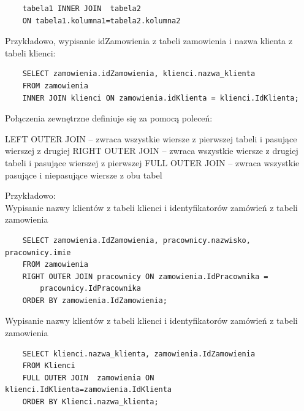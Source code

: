 \documentclass[12pt]{article}
\begin{document}
    \begin{verbatim}
    tabela1 INNER JOIN  tabela2
    ON tabela1.kolumna1=tabela2.kolumna2
    \end{verbatim}
    Przykładowo, wypisanie idZamowienia z tabeli zamowienia i nazwa klienta z tabeli klienci:
    
    \begin{verbatim}
    SELECT zamowienia.idZamowienia, klienci.nazwa_klienta
    FROM zamowienia
    INNER JOIN klienci ON zamowienia.idKlienta = klienci.IdKlienta;
    \end{verbatim}
    
    Połączenia zewnętrzne definiuje się za pomocą poleceń:
    
    LEFT OUTER JOIN – zwraca wszystkie wiersze z pierwszej tabeli i pasujące wierszej z drugiej
    RIGHT OUTER JOIN – zwraca wszystkie wiersze z drugiej tabeli i pasujące wierszej z pierwszej
    FULL OUTER JOIN – zwraca wszystkie pasujące i niepasujące wiersze z obu tabel
    
    Przykładowo:\\
    Wypisanie nazwy klientów z tabeli klienci i identyfikatorów zamówień z tabeli zamowienia
    \begin{verbatim}
    SELECT zamowienia.IdZamowienia, pracownicy.nazwisko, pracownicy.imie
    FROM zamowienia
    RIGHT OUTER JOIN pracownicy ON zamowienia.IdPracownika =
        pracownicy.IdPracownika
    ORDER BY zamowienia.IdZamowienia;
    \end{verbatim}
    Wypisanie nazwy klientów z tabeli klienci i identyfikatorów zamówień z tabeli zamowienia
    
    \begin{verbatim}
    SELECT klienci.nazwa_klienta, zamowienia.IdZamowienia
    FROM Klienci
    FULL OUTER JOIN  zamowienia ON klienci.IdKlienta=zamowienia.IdKlienta
    ORDER BY Klienci.nazwa_klienta;
    \end{verbatim}
    
\end{document}
